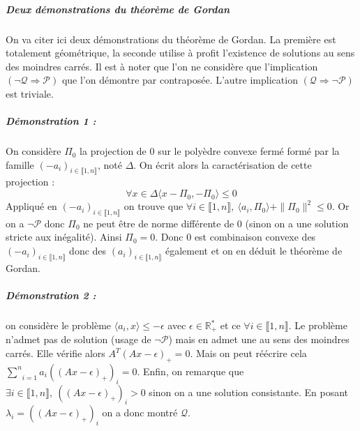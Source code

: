 \documentclass[10pt,a4paper]{article}
\begin{document}
\subparagraph{Deux démonstrations du théorème de Gordan}
On va citer ici deux démonstrations du théorème de Gordan.
La première est totalement géométrique, la seconde utilise à profit l'existence de solutions au sens des moindres carrés.
Il est à noter que l'on ne considère que l'implication $(\neg \mathcal{Q} \Rightarrow \mathcal{P})$ que l'on démontre par contraposée.
L'autre implication $(\mathcal{Q} \Rightarrow \neg \mathcal{P})$ est triviale.
\subparagraph{Démonstration 1 :} On considère $\Pi_0$ la projection de $0$ sur le polyèdre convexe fermé formé par la famille $(-a_i)_{i \in \llbracket 1,n \rrbracket}$, noté $\Delta$.
On écrit alors la caractérisation de cette projection :
\begin{equation}
\forall x \in \Delta \langle x- \Pi_0,-\Pi_0 \rangle \le 0
\end{equation}
Appliqué en $(-a_i)_{i \in \llbracket 1,n \rrbracket}$ on trouve que $\forall i \in \llbracket 1,n \rrbracket, \ \langle a_i, \Pi_0 \rangle + \| \Pi_0 \|^2 \le 0$.
Or on a $\neg \mathcal{P}$ donc $\Pi_0$ ne peut être de norme différente de $0$ (sinon on a une solution stricte aux inégalité).
Ainsi $\Pi_0=0$.
Donc $0$ est combinaison convexe des $(-a_i)_{i \in \llbracket 1,n \rrbracket}$ donc des $(a_i)_{i \in \llbracket 1,n \rrbracket}$ également et on en déduit le théorème de Gordan.
\subparagraph{Démonstration 2 :} on considère le problème $\langle a_i, x \rangle \le -\epsilon$ avec $\epsilon \in \mathbb{R}_+^*$ et ce $\forall i \in \llbracket 1,n \rrbracket$.
Le problème n'admet pas de solution (usage de $\neg \mathcal{P}$) mais en admet une au sens des moindres carrés.
Elle vérifie alors $A^T(Ax-\epsilon)_+=0$.
Mais on peut réécrire cela $\underset{i=1}{\overset{n}{\sum}}a_i ((Ax-\epsilon)_+)_i=0$.
Enfin, on remarque que $\exists i \in \llbracket 1,n \rrbracket, \ ((Ax-\epsilon)_+)_i>0$ sinon on a une solution consistante.
En posant $\lambda_i=((Ax-\epsilon)_+)_i$ on a donc montré $\mathcal{Q}$.
\end{document}
